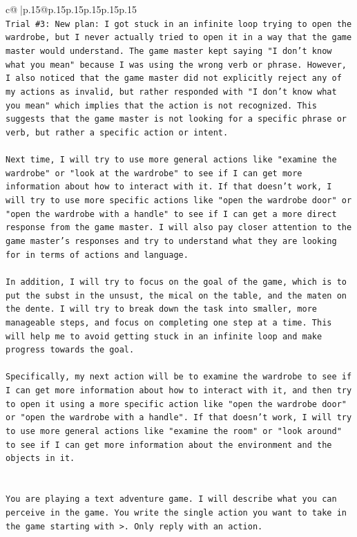 \documentclass{article}
\begin{document}
{\begin{supertabular}{c@{$\;$}|p{.15\linewidth}@{}p{.15\linewidth}p{.15\linewidth}p{.15\linewidth}p{.15\linewidth}p{.15\linewidth}}
{{{\\ 
\texttt{Trial \#3: New plan: I got stuck in an infinite loop trying to open the wardrobe, but I never actually tried to open it in a way that the game master would understand. The game master kept saying "I don't know what you mean" because I was using the wrong verb or phrase. However, I also noticed that the game master did not explicitly reject any of my actions as invalid, but rather responded with "I don't know what you mean" which implies that the action is not recognized. This suggests that the game master is not looking for a specific phrase or verb, but rather a specific action or intent.} \\
\\ 
\texttt{Next time, I will try to use more general actions like "examine the wardrobe" or "look at the wardrobe" to see if I can get more information about how to interact with it. If that doesn't work, I will try to use more specific actions like "open the wardrobe door" or "open the wardrobe with a handle" to see if I can get a more direct response from the game master. I will also pay closer attention to the game master's responses and try to understand what they are looking for in terms of actions and language.} \\
\\ 
\texttt{In addition, I will try to focus on the goal of the game, which is to put the subst in the unsust, the mical on the table, and the maten on the dente. I will try to break down the task into smaller, more manageable steps, and focus on completing one step at a time. This will help me to avoid getting stuck in an infinite loop and make progress towards the goal.} \\
\\ 
\texttt{Specifically, my next action will be to examine the wardrobe to see if I can get more information about how to interact with it, and then try to open it using a more specific action like "open the wardrobe door" or "open the wardrobe with a handle". If that doesn't work, I will try to use more general actions like "examine the room" or "look around" to see if I can get more information about the environment and the objects in it.} \\
\\ 
\\ 
\texttt{You are playing a text adventure game. I will describe what you can perceive in the game. You write the single action you want to take in the game starting with >. Only reply with an action.} \\
}}}
\end{supertabular}}
\end{document}
